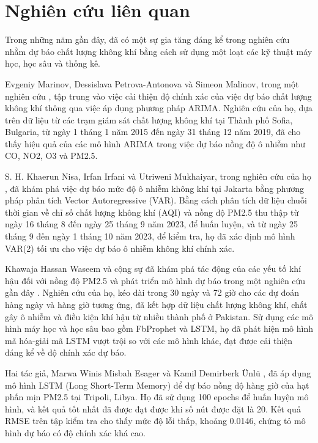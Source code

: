 \section{Nghiên cứu liên quan}

Trong những năm gần đây, đã có một sự gia tăng đáng kể trong nghiên cứu nhằm dự báo chất lượng không khí bằng cách sử dụng một loạt các kỹ thuật máy học, học sâu và thống kê.

Evgeniy Marinov, Dessislava Petrova-Antonova và Simeon Malinov, trong một nghiên cứu \cite{b1}, tập trung vào việc cải thiện độ chính xác của việc dự báo chất lượng không khí thông qua việc áp dụng phương pháp ARIMA. Nghiên cứu của họ, dựa trên dữ liệu từ các trạm giám sát chất lượng không khí tại Thành phố Sofia, Bulgaria, từ ngày 1 tháng 1 năm 2015 đến ngày 31 tháng 12 năm 2019, đã cho thấy hiệu quả của các mô hình ARIMA trong việc dự báo nồng độ ô nhiễm như CO, NO2, O3 và PM2.5.

S. H. Khaerun Nisa, Irfan Irfani và Utriweni Mukhaiyar, trong nghiên cứu của họ \cite{b2}, đã khám phá việc dự báo mức độ ô nhiễm không khí tại Jakarta bằng phương pháp phân tích Vector Autoregressive (VAR). Bằng cách phân tích dữ liệu chuỗi thời gian về chỉ số chất lượng không khí (AQI) và nồng độ PM2.5 thu thập từ ngày 16 tháng 8 đến ngày 25 tháng 9 năm 2023, để huấn luyện, và từ ngày 25 tháng 9 đến ngày 1 tháng 10 năm 2023, để kiểm tra, họ đã xác định mô hình VAR(2) tối ưu cho việc dự báo ô nhiễm không khí chính xác.

Khawaja Hassan Waseem và cộng sự đã khám phá tác động của các yếu tố khí hậu đối với nồng độ PM2.5 và phát triển mô hình dự báo trong một nghiên cứu gần đây \cite{b3}. Nghiên cứu của họ, kéo dài trong 30 ngày và 72 giờ cho các dự đoán hàng ngày và hàng giờ tương ứng, đã kết hợp dữ liệu chất lượng không khí, chất gây ô nhiễm và điều kiện khí hậu từ nhiều thành phố ở Pakistan. Sử dụng các mô hình máy học và học sâu bao gồm FbProphet và LSTM, họ đã phát hiện mô hình mã hóa-giải mã LSTM vượt trội so với các mô hình khác, đạt được cải thiện đáng kể về độ chính xác dự báo.

Hai tác giả, Marwa Winis Misbah Esager và Kamil Demirberk Ünlü \cite{b4}, đã áp dụng mô hình LSTM (Long Short-Term Memory) để dự báo nồng độ hàng giờ của hạt phấn mịn PM2.5 tại Tripoli, Libya. Họ đã sử dụng 100 epochs để huấn luyện mô hình, và kết quả tốt nhất đã được đạt được khi số nút được đặt là 20. Kết quả RMSE trên tập kiểm tra cho thấy mức độ lỗi thấp, khoảng 0.0146, chứng tỏ mô hình dự báo có độ chính xác khá cao.

